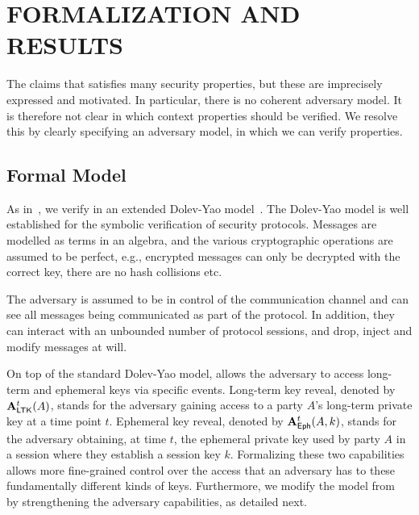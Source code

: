 \documentclass[runningheads]{llncs}
\begin{document}
\section{\uppercase{Formalization and Results}}
\label{sec:formalization}
The \mEdhoc{} \mSpec{} \cite{our-analysis-selander-lake-edhoc-00} claims
that \mEdhoc{} satisfies many security properties, but these are imprecisely
expressed and motivated.
%
In particular, there is no coherent adversary model.
%
It is therefore not clear in which context properties should be verified.
%
We resolve this by clearly specifying an adversary model, in which we can 
verify
properties.
%

\subsection{Formal Model}\label{sec:threat-model}
As in~\cite{Norr21}, we verify \mEdhoc{} in an extended
Dolev-Yao model~\cite{DY83}.
%
The Dolev-Yao model is well established for the symbolic verification of 
security
protocols.
%
Messages are modelled as terms in an algebra, and the various cryptographic
operations are assumed to be perfect, e.g., encrypted messages can only be
decrypted with the correct key, there are no hash collisions etc.
%

The adversary is assumed to be in control of the communication
channel and can see all messages being communicated as part of the protocol.
%
In addition, they can interact with an unbounded number of protocol sessions,
and drop, inject and modify messages at will.
%

On top of the standard Dolev-Yao model, \cite{Norr21} allows the adversary to
access long-term and ephemeral keys via specific events.
%
Long-term key reveal, denoted by $\mathbf{A}_{\textsf{LTK}}^{t}(A)$, stands for the adversary
gaining access to a party $A$'s long-term private key  at a time point 
$t$.
%
Ephemeral key reveal, denoted by $\mathbf{A}_{\textsf{Eph}}^{t}(A, k)$, stands for the 
adversary
obtaining, at time $t$, the ephemeral private key  used by party $A$
in a session where they establish a session key $k$.
%
Formalizing these two capabilities allows more fine-grained control
over the access that an adversary has to these fundamentally different kinds of
keys.
%
Furthermore, we modify the model from~\cite{Norr21} by strengthening the
adversary capabilities, as detailed next.
%
\end{document}
